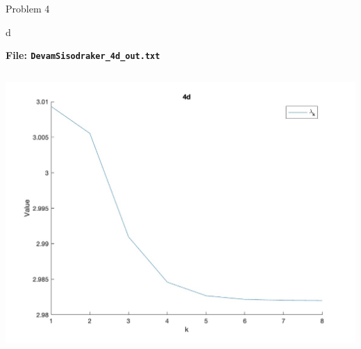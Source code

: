 \begin{section}{Problem 4}
\begin{solution}{d}
        \continued
        
        \begin{mdframed}
            \footnotesize
            \textbf{File: {\tt DevamSisodraker\_4d\_out.txt}}
            \inputminted{matlab}{DevamSisodraker_4d_out.txt}
            \normalfont
        \end{mdframed}

        \continued

        \begin{mdframed}
            \includegraphics[scale=0.33]{DevamSisodraker_4d.jpg}
        \end{mdframed}
    \end{solution}
\end{section}